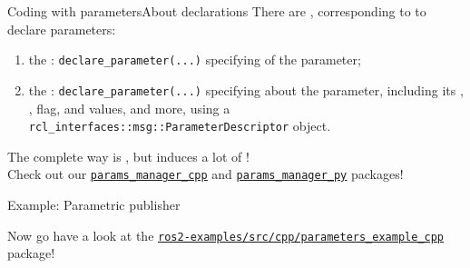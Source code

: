 \begin{frame}{Coding with parameters}{About declarations}
  There are , corresponding to  to declare parameters:
  \begin{enumerate}
    \item the : \texttt{declare\_parameter(...)} specifying  of the parameter;
    \item the : \texttt{declare\_parameter(...)} specifying  about the parameter, including its , ,  flag,  and  values,  and more, using a \texttt{rcl\_interfaces::msg::ParameterDescriptor} object.
  \end{enumerate}
  \begin{alertblock}{}
    \centering
    The complete way is , but induces a lot of !\\
    Check out our \href{https://github.com/dotX-Automation/params_manager_cpp}{\color{blue}\underline{\texttt{params\_manager\_cpp}}} and \href{https://github.com/dotX-Automation/params_manager_py}{\color{blue}\underline{\texttt{params\_manager\_py}}} packages!
  \end{alertblock}
\end{frame}

\begin{frame}{Example: Parametric publisher}
  \begin{block}{}
    \centering
    Now go have a look at the \href{https://github.com/IntelligentSystemsLabUTV/ros2-examples/tree/jazzy/src/cpp/parameters_example_cpp}{\color{blue}\underline{\texttt{ros2-examples/src/cpp/parameters\_example\_cpp}}} package!
  \end{block}
\end{frame}
